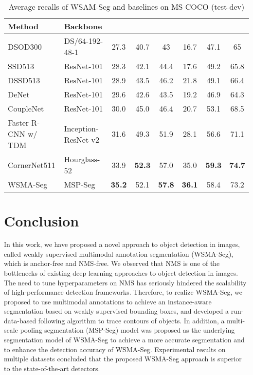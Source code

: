 \documentclass{article}
\begin{document}
\begin{table*}[!ht]
   \centering
   \vspace{-0.5em}
	\caption{Average recalls of WSAM-Seg and baselines on MS COCO (test-dev)\label{coco_recall}}
\begin{small}
   \begin{tabular}{|l|l|c|c|c|c|c|c|}
   \hline
   Method&Backbone& & & && &  \\\hline
   DSOD300&DS/64-192-48-1&27.3&40.7&43&16.7&47.1&65\\\hline
   SSD513&ResNet-101&28.3&42.1&44.4&17.6&49.2&65.8\\\hline
   DSSD513&ResNet-101&28.9&43.5&46.2&21.8&49.1&66.4\\\hline
   DeNet&ResNet-101&29.6&42.6&43.5&19.2&46.9&64.3\\\hline
   CoupleNet&ResNet-101&30.0&45.0&46.4&20.7&53.1&68.5\\\hline
   Faster R-CNN w/ TDM&Inception-ResNet-v2&31.6&49.3&51.9&28.1&56.6&71.1\\\hline
   CornerNet511&Hourglass-52&33.9&\textbf{52.3}&57.0&35.0&\textbf{59.3}&\textbf{74.7}\\\hline
   WSMA-Seg&MSP-Seg&\textbf{35.2}&52.1&\textbf{57.8}&\textbf{36.1}&58.4&73.2\\\hline
  \end{tabular}\end{small}
\end{table*}
	
\section{Conclusion}
In this work, we have proposed a novel approach to object detection in images, called weakly su\-per\-vised multimodal annotation segmentation (WSMA-Seg), which is anchor-free and NMS-free. We observed that  NMS is one of the bottlenecks of existing deep learning 
approaches to object detection in images. The need to tune hyperparameters on NMS has seriously hindered the scalability of high-performance detection frameworks. Therefore, to realize WSMA-Seg, we proposed to use multimodal annotations to achieve an instance-aware segmentation based on weakly supervised bounding boxes, and developed a run-data-based following algorithm to trace contours of objects. In addition, a multi-scale pooling segmentation (MSP-Seg) model was proposed as the underlying segmentation model of WSMA-Seg to achieve a more accurate segmentation and to enhance the detection accuracy of WSMA-Seg. Experimental results on multiple datasets concluded that the proposed WSMA-Seg approach is superior to the state-of-the-art detectors.
{\small


}
\end{document}
